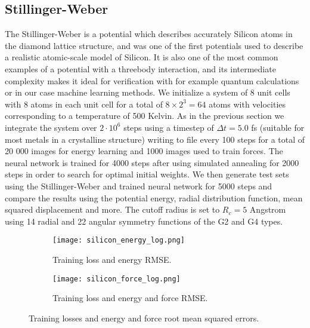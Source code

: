 \subsection{Stillinger-Weber}
The Stillinger-Weber is a potential which describes accurately
Silicon atoms in the diamond lattice structure, and was
one of the first potentials used to describe a realistic atomic-scale
model of Silicon. It is also one of the most common examples
of a potential with a threebody interaction, and its intermediate complexity
makes it ideal for verification with for example quantum calculations
or in our case machine learning methods.
We initialize a system of 8 unit cells with 8 atoms in each unit cell
for a total of $8 \times 2^3 = 64$ atoms with velocities corresponding
to a temperature of 500 Kelvin.
As in the previous section we integrate the system over $2 \cdot 10^6$
steps using a timestep of $\Delta t = 5.0$ fs (suitable for most metals
in a crystalline structure) writing to file every 100 steps
for a total of 20 000 images for energy learning
and 1000 images used to train forces.
The neural network is trained for 4000 steps after using simulated annealing
for 2000 steps in order to search for optimal initial weights.
We then generate test sets using the Stillinger-Weber and trained neural network
for 5000 steps and compare the results using the potential energy,
radial distribution function, mean squared displacement and more.
The cutoff radius is set to $R_c = 5$ Angstrom using 14 radial and
22 angular symmetry functions of the G2 and G4 types.

\begin{figure}[H]
\begin{adjustbox}{max width=1.2\linewidth,center}
\centering
  \begin{subfigure}[b]{0.55\textwidth}
      \texttt{[image: silicon\_energy\_log.png]}
    \caption{Training loss and energy RMSE.}
  \end{subfigure}
  \hfill
  \begin{subfigure}[b]{0.55\textwidth}
      \texttt{[image: silicon\_force\_log.png]}
    \caption{Training loss and energy and force RMSE.}
  \end{subfigure}
\end{adjustbox}
\caption{Training losses and energy and force root mean squared errors.}
    \label{fig:silicon-log}
\end{figure}

